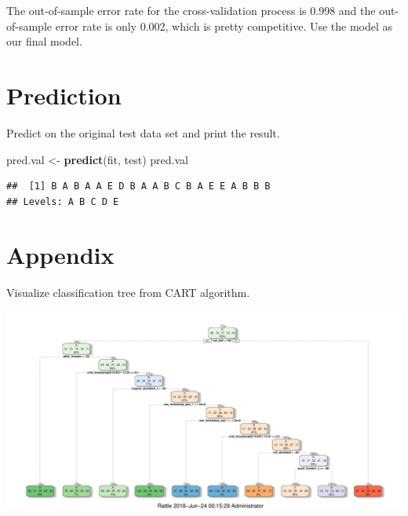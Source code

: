 \documentclass[]{article}
\newenvironment{Shaded}{\begin{snugshade}}{\end{snugshade}}
\newcommand{\KeywordTok}[1]{\textcolor[rgb]{0.13,0.29,0.53}{\textbf{#1}}}
\newcommand{\DataTypeTok}[1]{\textcolor[rgb]{0.13,0.29,0.53}{#1}}
\newcommand{\StringTok}[1]{\textcolor[rgb]{0.31,0.60,0.02}{#1}}
\newcommand{\OperatorTok}[1]{\textcolor[rgb]{0.81,0.36,0.00}{\textbf{#1}}}
\newcommand{\NormalTok}[1]{#1}
\begin{document}
The out-of-sample error rate for the cross-validation process is 0.998
and the out-of-sample error rate is only 0.002, which is pretty
competitive. Use the model as our final model.

\section{Prediction}\label{prediction}

Predict on the original test data set and print the result.

\begin{Shaded}
\begin{Highlighting}[]
\NormalTok{pred.val <-}\StringTok{ }\KeywordTok{predict}\NormalTok{(fit, test)}
\NormalTok{pred.val}
\end{Highlighting}
\end{Shaded}

\begin{verbatim}
##  [1] B A B A A E D B A A B C B A E E A B B B
## Levels: A B C D E
\end{verbatim}

\newpage

\section{Appendix}\label{appendix}

Visualize classification tree from CART algorithm.

\begin{Shaded}
\end{Shaded}

\includegraphics{Project_files/figure-latex/unnamed-chunk-12-1.pdf}
\end{document}
